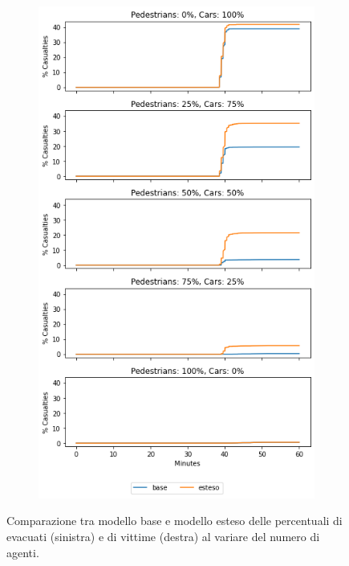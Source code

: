 \begin{figure}[ht]
\begin{subfigure}{0.45\textwidth}
    \end{subfigure}
    \hfill
    \begin{subfigure}{0.45\textwidth}
        \centering
        \includegraphics[width=\textwidth]{images/analisi/comparison-total-casualties.png}
    \end{subfigure}
    \caption{Comparazione tra modello base e modello esteso delle percentuali di evacuati (sinistra) e di vittime (destra) al variare del numero di agenti.}
    \label{fig:analisi-comparison-total-ec}
\end{figure}

